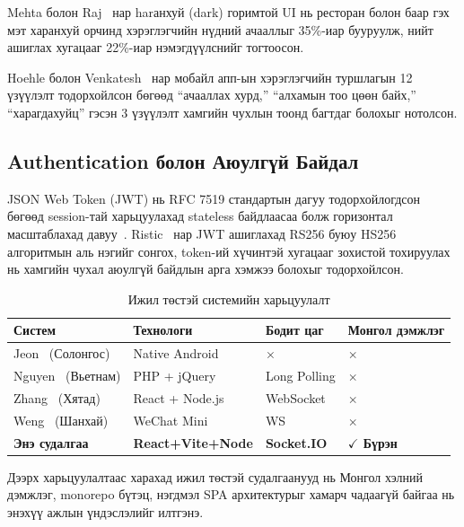 \documentclass[12pt,a4paper]{article}
\begin{document}
Mehta болон Raj~\cite{mehta2022} нар harанхуй (dark) горимтой UI нь
ресторан болон баар гэх мэт харанхуй орчинд хэрэглэгчийн нүдний
ачааллыг 35\%-иар бууруулж, нийт ашиглах хугацааг 22\%-иар
нэмэгдүүлснийг тогтоосон.

Hoehle болон Venkatesh~\cite{hoehle2015} нар мобайл апп-ын
хэрэглэгчийн туршлагын 12 үзүүлэлт тодорхойлсон бөгөөд
``ачааллах хурд,'' ``алхамын тоо цөөн байх,'' ``харагдахуйц'' гэсэн 3 үзүүлэлт хамгийн чухлын тоонд багтдаг болохыг нотолсон.

\subsection{Authentication болон Аюулгүй Байдал}

JSON Web Token (JWT) нь RFC 7519 стандартын дагуу тодорхойлогдсон
бөгөөд session-тай харьцуулахад stateless байдлаасаа болж
горизонтал масштаблахад давуу~\cite{jones2015}. Ristic~\cite{ristic2014}
нар JWT ашиглахад RS256 буюу HS256 алгоритмын аль нэгийг сонгох,
token-ий хүчинтэй хугацааг зохистой тохируулах нь хамгийн чухал
аюулгүй байдлын арга хэмжээ болохыг тодорхойлсон.

\begin{table}[H]
\caption{Ижил төстэй системийн харьцуулалт}
\label{tab:related}
\centering
\begin{tabularx}{\textwidth}{@{}p{3cm}p{2.5cm}p{2.5cm}p{4cm}@{}}
\toprule
\textbf{Систем} & \textbf{Технологи} & \textbf{Бодит цаг} & \textbf{Монгол дэмжлэг} \\
\midrule
Jeon~\cite{jeon2020} (Солонгос) & Native Android & $\times$ & $\times$ \\
Nguyen~\cite{nguyen2021} (Вьетнам) & PHP + jQuery & Long Polling & $\times$ \\
Zhang~\cite{zhang2021} (Хятад) & React + Node.js & WebSocket & $\times$ \\
Weng~\cite{weng2022} (Шанхай) & WeChat Mini & WS & $\times$ \\
\textbf{Энэ судалгаа} & \textbf{React+Vite+Node} & \textbf{Socket.IO} & \textbf{$\checkmark$ Бүрэн} \\
\bottomrule
\end{tabularx}
\end{table}

Дээрх харьцуулалтаас харахад ижил төстэй судалгаанууд нь Монгол
хэлний дэмжлэг, monorepo бүтэц, нэгдмэл SPA архитектурыг
хамарч чадаагүй байгаа нь энэхүү ажлын үндэслэлийг илтгэнэ.

\end{document}
